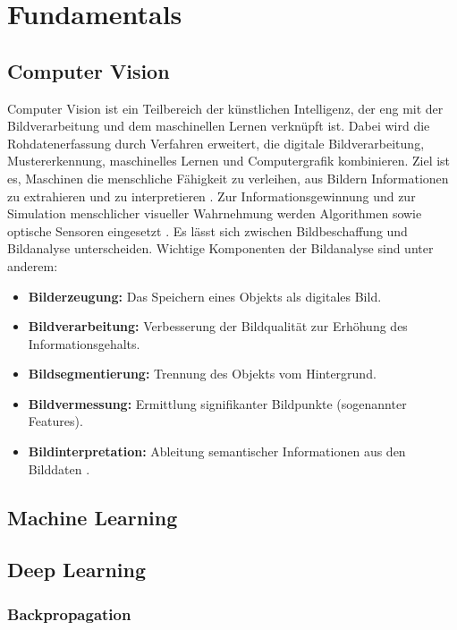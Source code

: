 \chapter{Fundamentals}
\label{ch:fundamentals}

\section{Computer Vision}
Computer Vision ist ein Teilbereich der künstlichen Intelligenz, der eng mit der Bildverarbeitung und dem maschinellen Lernen verknüpft ist. Dabei wird die Rohdatenerfassung durch Verfahren erweitert, die digitale Bildverarbeitung, Mustererkennung, maschinelles Lernen und Computergrafik kombinieren. Ziel ist es, Maschinen die menschliche Fähigkeit zu verleihen, aus Bildern Informationen zu extrahieren und zu interpretieren \cite{Wiley2018}. Zur Informationsgewinnung und zur Simulation menschlicher visueller Wahrnehmung werden Algorithmen sowie optische Sensoren eingesetzt \cite{Matiacevich2013}. Es lässt sich zwischen Bildbeschaffung und Bildanalyse unterscheiden. Wichtige Komponenten der Bildanalyse sind unter anderem:
\begin{itemize}
    \item \textbf{Bilderzeugung:} Das Speichern eines Objekts als digitales Bild.
    \item \textbf{Bildverarbeitung:} Verbesserung der Bildqualität zur Erhöhung des Informationsgehalts.
    \item \textbf{Bildsegmentierung:} Trennung des Objekts vom Hintergrund.
    \item \textbf{Bildvermessung:} Ermittlung signifikanter Bildpunkte (sogenannter Features).
    \item \textbf{Bildinterpretation:} Ableitung semantischer Informationen aus den Bilddaten \cite{Mery2013}. 
\end{itemize}



\section{Machine Learning}
\section{Deep Learning}
\subsection{Backpropagation}
